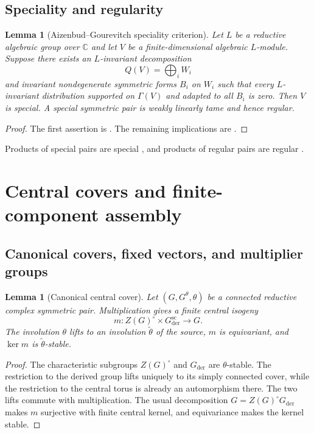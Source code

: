 \documentclass[11pt,reqno]{amsart}
\numberwithin{equation}{section}
\newtheorem{lemma}[theorem]{Lemma}
\theoremstyle{definition}
\theoremstyle{remark}
\newcommand{\C}{\mathbb C}
\begin{document}
\subsection{Speciality and regularity}

\begin{lemma}[Aizenbud--Gourevitch speciality criterion]
\label{core:lem:speciality-criterion}
Let $L$ be a reductive algebraic group over $\C$ and let $V$ be a
finite-dimensional algebraic $L$-module.  Suppose there exists an
$L$-invariant decomposition
\[
 Q(V)=\bigoplus_i W_i
\]
and invariant nondegenerate symmetric forms $B_i$ on $W_i$ such that every
$L$-invariant distribution supported on $\Gamma(V)$ and adapted to all $B_i$
is zero.  Then $V$ is special.  A special symmetric pair is weakly linearly
tame and hence regular.
\end{lemma}

\begin{proof}
The first assertion is \cite[Lemma~6.0.10]{AG09}.  The remaining implications
are \cite[Proposition~7.3.5 and Remark~7.4.3]{AG09}.
\end{proof}

Products of special pairs are special
\cite[Proposition~7.3.6]{AG09}, and products of regular pairs are regular
\cite[Proposition~7.4.4]{AG09}.


\section{Central covers and finite-component assembly}\label{sec:component-assembly}

\subsection{Canonical covers, fixed vectors, and multiplier groups}

\begin{lemma}[Canonical central cover]\label{lem:canonical-cover}
Let $(G,G^\theta,\theta)$ be a connected reductive complex symmetric pair.
Multiplication gives a finite central isogeny
\[
 m:Z(G)^\circ\times G_{\mathrm{der}}^{\mathrm{sc}}\longrightarrow G.
\]
The involution $\theta$ lifts to an involution $\widetilde\theta$ of the source,
$m$ is equivariant, and $\ker m$ is $\widetilde\theta$-stable.
\end{lemma}

\begin{proof}
The characteristic subgroups $Z(G)^\circ$ and $G_{\mathrm{der}}$ are
$\theta$-stable.  The restriction to the derived group lifts uniquely to its
simply connected cover, while the restriction to the central torus is already
an automorphism there.  The two lifts commute with multiplication.  The usual
decomposition $G=Z(G)^\circ G_{\mathrm{der}}$ makes $m$ surjective with finite
central kernel, and equivariance makes the kernel stable.
\end{proof}
\end{document}

